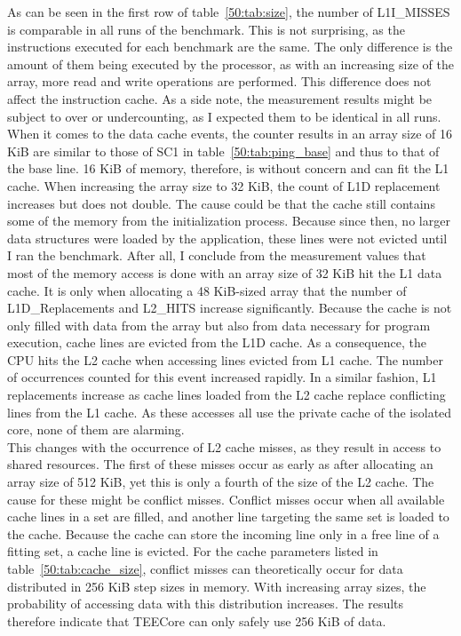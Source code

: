 As can be seen in the first row of table~\ref{50:tab:size}, the number of
L1I\_MISSES is comparable in all runs of the benchmark. This is not surprising,
as the instructions executed for each benchmark are the same. The only
difference is the amount of them being executed by the processor, as with an
increasing size of the array, more read and write operations are performed. This
difference does not affect the instruction cache. As a side note, the
measurement results might be subject to over or undercounting, as I expected
them to be identical in all runs. \\
When it comes to the data cache events, the counter results in an array size of
16 KiB are similar to those of SC1 in table~\ref{50:tab:ping_base} and thus to
that of the base line. 16 KiB of memory, therefore, is without concern and can
fit the L1 cache. When increasing the array size to 32 KiB, the count of L1D
replacement increases but does not double. The cause could be that the cache
still contains some of the memory from the initialization process. Because since
then, no larger data structures were loaded by the application, these lines were
not evicted until I ran the benchmark. After all, I conclude from the
measurement values that most of the memory access is done with an array size of
32 KiB hit the L1 data cache. It is only when allocating a 48 KiB-sized array
that the number of L1D\_Replacements and L2\_HITS increase significantly.
Because the cache is not only filled with data from the array but also from data
necessary for program execution, cache lines are evicted from the L1D cache. As
a consequence, the CPU hits the L2 cache when accessing lines evicted from L1
cache. The number of occurrences counted for this event increased rapidly. In a
similar fashion, L1 replacements increase as cache lines loaded from the L2
cache replace conflicting lines from the L1 cache. As these accesses all use the
private cache of the isolated core, none of them are alarming.\\
This changes with the occurrence of L2 cache misses, as they result in access to
shared resources. The first of these misses occur as early as after allocating
an array size of 512 KiB, yet this is only a fourth of the size of the L2 cache.
The cause for these might be conflict misses. Conflict misses occur when all
available cache lines in a set are filled, and another line targeting the same set
is loaded to the cache. Because the cache can store the incoming line only in a
free line of a fitting set, a cache line is evicted. For the cache parameters
listed in table~\ref{50:tab:cache_size}, conflict misses can theoretically occur
for data distributed in 256 KiB step sizes in memory. With increasing array
sizes, the probability of accessing data with this distribution increases. The
results therefore indicate that TEECore can only safely use 256 KiB of data.

